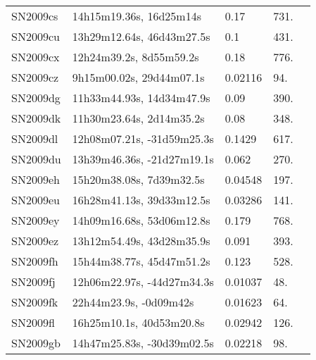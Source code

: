 \begin{longtable}{lllll}
         SN2009cs &        14h15m19.36s, 16d25m14s &     0.17 &           731. &    \citet{2009CBET.1754A...1Q} \\
         SN2009cu &      13h29m12.64s, 46d43m27.5s &      0.1 &           431. &    \citet{2009CBET.1754A...1Q} \\
         SN2009cx &        12h24m39.2s, 8d55m59.2s &     0.18 &           776. &    \citet{2009CBET.1754A...1Q} \\
         SN2009cz &       9h15m00.02s, 29d44m07.1s &  0.02116 &            94. &    \citet{2014ApJS..213...35G} \\
         SN2009dg &      11h33m44.93s, 14d34m47.9s &     0.09 &           390. &    \citet{2009CBET.1766A...1D} \\
         SN2009dk &       11h30m23.64s, 2d14m35.2s &     0.08 &           348. &    \citet{2009CBET.1766A...1D} \\
         SN2009dl &     12h08m07.21s, -31d59m25.3s &   0.1429 &           617. &    \citet{2009CBET.1766A...1D} \\
         SN2009du &     13h39m46.36s, -21d27m19.1s &    0.062 &           270. &    \citet{2009CBET.1791A...1D} \\
         SN2009eh &       15h20m38.08s, 7d39m32.5s &  0.04548 &           197. &    \citet{2011ApJ...735..125S} \\
         SN2009eu &      16h28m41.13s, 39d33m12.5s &  0.03286 &           141. &    \citet{1961AJ.....66..558M} \\
         SN2009ey &      14h09m16.68s, 53d06m12.8s &    0.179 &           768. &    \citet{2009CBET.1819A...1K} \\
         SN2009ez &      13h12m54.49s, 43d28m35.9s &    0.091 &           393. &    \citet{2009CBET.1819A...1K} \\
         SN2009fh &      15h44m38.77s, 45d47m51.2s &    0.123 &           528. &    \citet{2009CBET.1819A...1K} \\
         SN2009fj &     12h06m22.97s, -44d27m34.3s &  0.01037 &            48. &    \citet{2004AJ....128...16K} \\
         SN2009fk &         22h44m23.9s, -0d09m42s &  0.01623 &            64. &    \citet{2005AJ....130.1037C} \\
         SN2009fl &       16h25m10.1s, 40d53m20.8s &  0.02942 &           126. &    \citet{1999MNRAS.305..259W} \\
         SN2009gb &     14h47m25.83s, -30d39m02.5s &  0.02218 &            98. &  \citet{2007AandA...465...71T} \\

\end{longtable}
